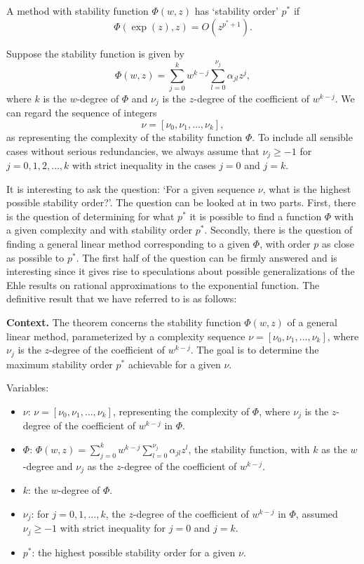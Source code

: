 \begin{definition}

  \label{def:521A}
A method with stability function $\Phi(w, z)$ has `stability order' $p^*$ if
\[
\Phi(\exp(z), z) = O(z^{p^*+1}).
\]

Suppose the stability function is given by
\[
\Phi(w, z) = \sum_{j=0}^{k} w^{k-j} \sum_{l=0}^{\nu_j} \alpha_{jl} z^{j},
\]
where $k$ is the $w$-degree of $\Phi$ and $\nu_j$ is the $z$-degree of the coefficient of $w^{k-j}$.
We can regard the sequence of integers
\[
\nu = [\nu_0, \nu_1, \dots, \nu_k],
\]
as representing the complexity of the stability function $\Phi$. To include all sensible cases without serious redundancies, we always assume that $\nu_j \geq -1$ for $j = 0, 1, 2, \dots, k$ with strict inequality in the cases $j = 0$ and $j = k$.

It is interesting to ask the question: `For a given sequence $\nu$, what is the highest possible stability order?'. The question can be looked at in two parts. First, there is the question of determining for what $p^*$ it is possible to find a function $\Phi$ with a given complexity and with stability order $p^*$. Secondly, there is the question of finding a general linear method corresponding to a given $\Phi$, with order $p$ as close as possible to $p^*$. The first half of the question can be firmly answered and is interesting since it gives rise to speculations about possible generalizations of the Ehle results on rational approximations to the exponential function. The definitive result that we have referred to is as follows:
\end{definition}

\noindent\textbf{Context.}
The theorem concerns the stability function $\Phi(w,z)$ of a general linear method, parameterized by a complexity sequence $\nu=[\nu_0,\nu_1,\dots,\nu_k]$, where $\nu_j$ is the $z$-degree of the coefficient of $w^{k-j}$. The goal is to determine the maximum stability order $p^*$ achievable for a given $\nu$.

Variables:
\begin{itemize}
    \item $\nu$: $\nu=[\nu_0,\nu_1,\dots,\nu_k]$, representing the complexity of $\Phi$, where $\nu_j$ is the $z$-degree of the coefficient of $w^{k-j}$ in $\Phi$.
    \item $\Phi$: $\Phi(w,z)=\sum_{j=0}^k w^{k-j} \sum_{l=0}^{\nu_j} \alpha_{jl} z^l$, the stability function, with $k$ as the $w$-degree and $\nu_j$ as the $z$-degree of the coefficient of $w^{k-j}$.
    \item $k$: the $w$-degree of $\Phi$.
    \item $\nu_j$: for $j=0,1,\dots,k$, the $z$-degree of the coefficient of $w^{k-j}$ in $\Phi$, assumed $\nu_j \ge -1$ with strict inequality for $j=0$ and $j=k$.
    \item $p^*$: the highest possible stability order for a given $\nu$.
\end{itemize}

